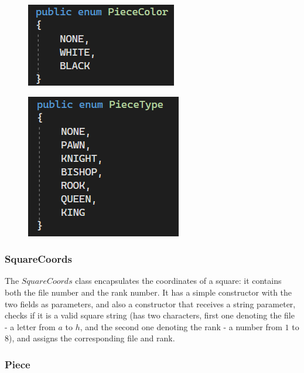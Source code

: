 \begin{figure}[h]
    \centering
    \begin{minipage}{.49\textwidth}
      \centering
      \includegraphics{figures/enum-piece-color.png}
      \label{fig:enumPieceColor}
    \end{minipage}
    \begin{minipage}{.49\textwidth}
      \centering
      \includegraphics{figures/enum-piece-type.png}
      \label{fig:enumPieceType}
    \end{minipage}
\end{figure}

\subsubsection{SquareCoords}
\label{subsubsec:ch5sec1subsec2subsubsec1}

The $SquareCoords$ class encapsulates the coordinates of a square: it contains both the file number and the rank number. It has a simple constructor with the two fields as parameters, and also a constructor that receives a string parameter, checks if it is a valid square string (has two characters, first one denoting the file - a letter from $a$ to $h$, and the second one denoting the rank - a number from $1$ to $8$), and assigns the corresponding file and rank.

\subsubsection{Piece}
\label{subsubsec:ch5sec1subsec2subsubsec2}

